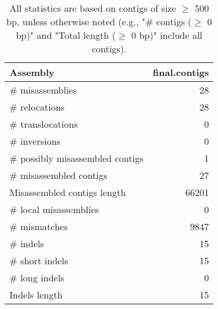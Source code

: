 \documentclass[12pt,a4paper]{article}
\begin{document}
\begin{table}[ht]
\begin{center}
\caption{All statistics are based on contigs of size $\geq$ 500 bp, unless otherwise noted (e.g., "\# contigs ($\geq$ 0 bp)" and "Total length ($\geq$ 0 bp)" include all contigs).}
\begin{tabular}{|l*{1}{|r}|}
\hline
Assembly & final.contigs \\ \hline
\# misassemblies & 28 \\ \hline
\hspace{5mm}\# relocations & 28 \\ \hline
\hspace{5mm}\# translocations & 0 \\ \hline
\hspace{5mm}\# inversions & 0 \\ \hline
\# possibly misassembled contigs & 1 \\ \hline
\# misassembled contigs & 27 \\ \hline
Misassembled contigs length & 66201 \\ \hline
\# local misassemblies & 0 \\ \hline
\# mismatches & 9847 \\ \hline
\# indels & 15 \\ \hline
\hspace{5mm}\# short indels & 15 \\ \hline
\hspace{5mm}\# long indels & 0 \\ \hline
Indels length & 15 \\ \hline
\end{tabular}
\end{center}
\end{table}
\end{document}
